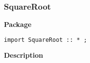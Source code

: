 \subsubsection{SquareRoot}
\label{sec-SquareRoot}

{\bf Package}

\begin{verbatim}
import SquareRoot :: * ;
\end{verbatim}

{\bf Description}

